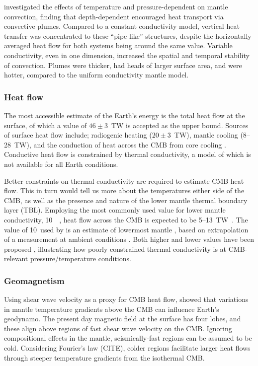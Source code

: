 \citet{Dubuffet2000} investigated the effects of temperature and pressure-dependent \tcs on mantle convection, finding that depth-dependent \tcs encouraged heat transport via convective plumes. Compared to a constant conductivity model, vertical heat transfer was concentrated to these ``pipe-like'' structures, despite the horizontally-averaged heat flow for both systems being around the same value. Variable conductivity, even in one dimension, increased the spatial and temporal stability of convection. Plumes were thicker, had heads of larger surface area, and were hotter, compared to the uniform conductivity mantle model.

\subsubsection{Heat flow}

The most accessible estimate of the Earth's energy is the total heat flow at the surface, of which a value of $46\pm3$~TW is accepted as the upper bound. Sources of surface heat flow include; radiogenic heating ($20\pm3$~TW), mantle cooling (8--28~TW), and the conduction of heat across the CMB from core cooling \citep{Lay2008}. Conductive heat flow is constrained by thermal conductivity, a model of which is not available for all Earth conditions.

Better constraints on thermal conductivity are required to estimate CMB heat flow. This in turn would tell us more about the temperatures either side of the CMB, as well as the presence and nature of the lower mantle thermal boundary layer (TBL). Employing the most commonly used value for lower mantle conductivity, 10~\wmk~\citep{Lay2008}, heat flow across the CMB is expected to be 5--13~TW~\citep{Lay2008}. The value of 10~\wmks used by \citet{Lay2006} is an estimate of lowermost mantle \tc, based on extrapolation of a measurement at ambient conditions \citep{Osako1991}. Both higher and lower values have been proposed \citep[4--16~\wmk,][]{Manthilake2011}, illustrating how poorly constrained thermal conductivity is at CMB-relevant pressure/temperature conditions.

\subsubsection{Geomagnetism}

Using shear wave velocity as a proxy for CMB heat flow, \citet{Gubbins2007} showed that variations in mantle temperature gradients above the CMB can influence Earth's geodynamo. The present day magnetic field at the surface has four lobes, and these align above regions of fast shear wave velocity on the CMB. Ignoring compositional effects in the mantle, seismically-fast regions can be assumed to be cold. Considering Fourier's law (CITE), colder regions facilitate larger heat flows through steeper temperature gradients from the isothermal CMB.

